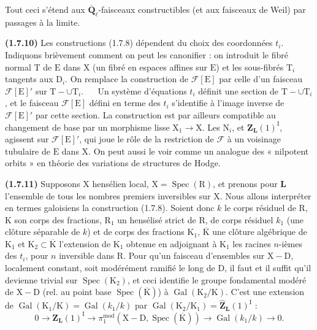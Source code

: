 \documentclass[11pt,leqno]{article}
\newcommand{\Page}[1]{\ifvmode\noindent\else\unskip\ \fi{\footnotesize\textcolor{gray}{[p.\,#1]}}\ \ignorespaces}
\begin{document}
Tout ceci s’étend aux \(\overline{\mathbf{Q}}_\ell\)-faisceaux constructibles (et aux faisceaux de Weil) par passages à la limite.

\textbf{(1.7.10)} Les constructions (1.7.8) dépendent du choix des coordonnées \(t_i\). Indiquons brièvement comment on peut les canonifier : on introduit le fibré normal \(\mathrm{T}\) de \(\mathrm{E}\) dans \(\mathrm{X}\) (un fibré en espaces affines sur \(\mathrm{E}\)) et les sous-fibrés \(\mathrm{T}_i\) tangents aux \(\mathrm{D}_i\). On remplace la construction de \(\mathscr{F}[\mathrm{E}]\) par celle d’un faisceau \(\mathscr{F}[\mathrm{E}]'\) sur \(\mathrm{T}-\cup\mathrm{T}_i\).
\Page{174}
Un système d’équations \(t_i\) définit une section de \(\mathrm{T}-\cup\mathrm{T}_i\), et le faisceau \(\mathscr{F}[\mathrm{E}]\) défini en terme des \(t_i\) s’identifie à l’image inverse de \(\mathscr{F}[\mathrm{E}]'\) par cette section. La construction est par ailleurs compatible au changement de base par un morphisme lisse \(\mathrm{X}_1\to\mathrm{X}\). Les \(\mathrm{N}_i\), et \(\mathbf{Z}_{\mathbf{L}}(1)^{\mathrm{I}}\), agissent sur \(\mathscr{F}[\mathrm{E}]'\), qui joue le rôle de la restriction de \(\mathscr{F}\) à un voisinage tubulaire de \(\mathrm{E}\) dans \(\mathrm{X}\). On peut aussi le voir comme un analogue des « nilpotent orbits » en théorie des variations de structures de Hodge.

\textbf{(1.7.11)} Supposons \(\mathrm{X}\) hensélien local, \(\mathrm{X}=\operatorname{Spec}(\mathrm{R})\), et prenons pour \(\mathbf{L}\) l’ensemble de tous les nombres premiers inversibles sur \(\mathrm{X}\). Nous allons interpréter en termes galoisiens la construction (1.7.8). Soient donc \(k\) le corps résiduel de \(\mathrm{R}\), \(\mathrm{K}\) son corps des fractions, \(\mathrm{R}_1\) un hensélisé strict de \(\mathrm{R}\), de corps résiduel \(k_1\) (une clôture séparable de \(k\)) et de corps des fractions \(\mathrm{K}_1\), \(\overline{\mathrm{K}}\) une clôture algébrique de \(\mathrm{K}_1\) et \(\mathrm{K}_2\subset\overline{\mathrm{K}}\) l’extension de \(\mathrm{K}_1\) obtenue en adjoignant à \(\mathrm{K}_1\) les racines \(n\)-ièmes des \(t_i\), pour \(n\) inversible dans \(\mathrm{R}\). Pour qu’un faisceau d’ensembles sur \(\mathrm{X}-\mathrm{D}\), localement constant, soit modérément ramifié le long de \(\mathrm{D}\), il faut et il suffit qu’il devienne trivial sur \(\operatorname{Spec}(\mathrm{K}_2)\), et ceci identifie le groupe fondamental modéré de \(\mathrm{X}-\mathrm{D}\) (rel. au point base \(\operatorname{Spec}(\overline{\mathrm{K}})\)) à \(\operatorname{Gal}(\mathrm{K}_2/\mathrm{K})\). C’est une extension de \(\operatorname{Gal}(\mathrm{K}_1/\mathrm{K})=\operatorname{Gal}(k_1/k)\) par \(\operatorname{Gal}(\mathrm{K}_2/\mathrm{K}_1)=\widehat{\mathbf{Z}}_{\mathbf{L}}(1)^{\mathrm{I}}\) :
\[
0\to\mathbf{Z}_{\mathbf{L}}(1)^{\mathrm{I}}
\to\pi_1^{\mathrm{mod}}(\mathrm{X}-\mathrm{D},\operatorname{Spec}(\overline{\mathrm{K}}))
\to\operatorname{Gal}(k_1/k)\to0.
\]
\end{document}
